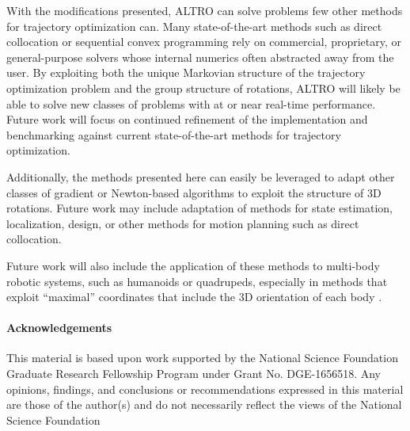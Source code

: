 \documentclass[letterpaper, 10 pt, conference]{ieeeconf}  %
\begin{document}
    With the modifications presented, ALTRO can solve problems few other methods for 
    trajectory optimization can. Many state-of-the-art methods such as direct 
    collocation or sequential convex programming rely on commercial, proprietary, or 
    general-purpose solvers whose internal numerics often abstracted away from the user. 
    By exploiting both the unique Markovian structure of the trajectory optimization problem
    and the group structure of rotations, ALTRO will likely be able to solve new classes of 
    problems with at or near real-time performance. Future work will focus on continued 
    refinement of the implementation and benchmarking against current state-of-the-art 
    methods for trajectory optimization.

    Additionally, the methods presented here can easily be leveraged to adapt other classes
    of gradient or Newton-based algorithms to exploit the structure of 3D rotations. Future
    work may include adaptation of methods for state estimation, localization, design, or 
    other methods for motion planning such as direct collocation. 
    
    Future work will also include the application of these methods to multi-body robotic
    systems, such as humanoids or quadrupeds, especially in methods that exploit 
    ``maximal'' coordinates that include the 3D orientation of each body \cite{brudigam2020linear}. 

\paragraph{Acknowledgements}
This material is based upon work supported by the National Science Foundation Graduate
Research Fellowship Program under Grant No. DGE-1656518. Any opinions, findings, and
conclusions or recommendations expressed in this material are those of the author(s) and
do not necessarily reflect the views of the National Science Foundation


\printbibliography
\end{document}
